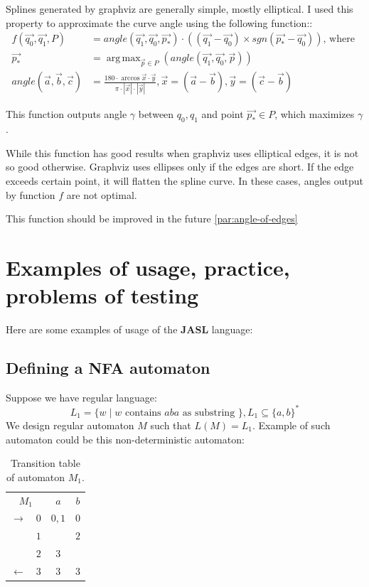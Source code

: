 \documentclass{ctuthesis}
\DeclareMathOperator*{\argmax}{arg\,max}
\begin{document}
Splines generated by graphviz are generally simple, mostly elliptical. I used this property to approximate the curve angle using the following function::
\begin{align*}
	f(\vec{q_0}, \vec{q_1}, P) &= angle(\vec{q_1}, \vec{q_0}, \vec{p_*}) \cdot ((\vec{q_1} - \vec{q_0})\times sgn(\vec{p_*} - \vec{q_0})) \text{, where } \\
	\vec{p_*} &= \argmax_{\vec{p} \in P} (angle(\vec{q_1}, \vec{q_0}, \vec{p})) \\
	angle(\vec{a}, \vec{b}, \vec{c}) &= \frac{
		180 \cdot \arccos{ \vec{x} \cdot \vec{y} }}{ \pi \cdot |\vec{x}| \cdot |\vec{y}| }, \vec{x} = (\vec{a} - \vec{b}), \vec{y} = (\vec{c}-\vec{b})
\end{align*}

This function outputs angle $\gamma$ between $q_0, q_1$ and point $\vec{p_*} \in P$, which maximizes $\gamma$. 

While this function has good results when graphviz uses elliptical edges, it is not so good otherwise. Graphviz uses ellipses only if the edges are short. If the edge exceeds certain point, it will flatten the spline curve. In these cases, angles output by function $f$ are not optimal. 

This function should be improved in the future \ref{par:angle-of-edges}

\chapter{Examples of usage, practice, problems of testing}
Here are some examples of usage of the \textbf{JASL} language: 

\section{Defining a NFA automaton}
\label{sec:example_NFA}
Suppose we have regular language: 
\begin{equation*}
L_1 = \{w \mid w \text{ contains } aba \text{ as substring }\}, L_1 \subseteq \{a, b\}^*
\end{equation*} 
We design regular automaton $M$ such that $L(M) = L_1$. Example of such automaton could be this non-deterministic automaton:
\begin{table}[H]
\begin{ctucolortab}
\begin{tabular}{cc|cc}
\multicolumn{2}{c}{\bfseries $M_1$} & \bfseries $a$ & \bfseries $b$ \\\Midrule
$\rightarrow$ 	& $0$ & $0,1$ 	& $0$  \\
				& $1$ &  	& $2$  \\
				& $2$ & $3$		&  \\
$\leftarrow$	& $3$ & $3$		& $3$ 
\end{tabular}
\end{ctucolortab}
\caption{Transition table of automaton $M_1$.}
\label{fig:examples_NFA_table}
\end{table} 
\end{document}
